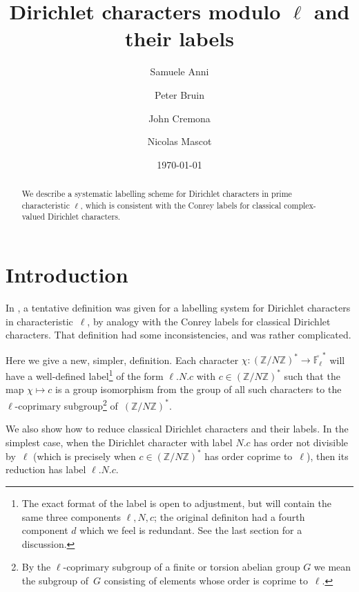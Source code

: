 \documentclass[a4paper, 10pt]{amsart}
\def\Z{{\mathbb Z}}
\def\Flbar{\overline{{\mathbb F}_{\ell}}}
\def\ZNs{(\Z/N\Z)^*}
\newcommand{\CLab}[2]{$#1.#2$}
\newcommand{\DLab}[3]{$#1.#2.#3$}
\begin{document}
\title{Dirichlet characters modulo $\ell$ and their labels}

\author{Samuele Anni}
\address{Aix-Marseille Universit\'e, France}
\author{Peter Bruin}
\address{Mathematisch Instituut, University of Leiden, Netherlands}
\author{John Cremona}
\address{Mathematics Institute, University of Warwick, Coventry CV4 7AL, UK}
\author{Nicolas Mascot}
\address{School of Mathematics, Trinity College, Dublin, Republic of Ireland}

\date{\today}

\begin {abstract}
We describe a systematic labelling scheme for Dirichlet characters in
prime characteristic $\ell$, which is consistent with the Conrey
labels for classical complex-valued Dirichlet characters.
\end {abstract}

\maketitle


\section{Introduction}
In \cite{OldDef}, a tentative definition was given for a labelling
system for Dirichlet characters in characteristic~$\ell$, by analogy
with the Conrey labels for classical Dirichlet characters.  That
definition had some inconsistencies, and was rather complicated.

Here we give a new, simpler, definition.  Each character
$\chi:\ZNs\to\Flbar^*$ will have a well-defined label\footnote{The
  exact format of the label is open to adjustment, but will contain
  the same three components $\ell,N,c$; the original definiton had a
  fourth component $d$ which we feel is redundant.  See the last
  section for a discussion.} of the form \DLab{\ell}{N}{c} with
$c\in\ZNs$ such that the map $\chi\mapsto c$ is a group isomorphism
from the group of all such characters to the $\ell$-coprimary
subgroup\footnote{By the $\ell$-coprimary subgroup of a finite or
  torsion abelian group $G$ we mean the subgroup of~$G$ consisting of
  elements whose order is coprime to~$\ell$.} of~$\ZNs$.

We also show how to reduce classical Dirichlet characters and their
labels.  In the simplest case, when the Dirichlet character with label
\CLab{N}{c} has order not divisible by~$\ell$ (which is precisely
when $c\in\ZNs$ has order coprime to~$\ell$), then its reduction
has label \DLab{\ell}{N}{c}.
\end{document}
